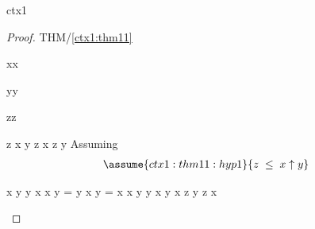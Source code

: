 \documentclass[12pt]{amsart}
\begin{document}
\begin{context}{ctx1}
\begin{proof}{THM/\ref{ctx1:thm11}}
\begin{free:var}{x}{x}
\begin{free:var}{y}{y}
\begin{free:var}{z}{z}
\begin{by:parts}
\begin{part:a}{ z \1\le x \uparrow y \2\implies z \le x \1\lor z \le y }
Assuming
	\begin{align}
	\assume{ctx1:thm11:hyp1}{ z \1\le x \uparrow y  } 
	\end{align}
	\begin{calculation}
		\true
		x \le y \1\lor y \le x
		x \uparrow y = y \1\lor x \uparrow y = x
		x \uparrow y \le y \1\lor x \uparrow y \le x
		z \le y \1\lor z \le x
	\end{calculation}
\end{part:a}
\end{by:parts}
	\end{free:var} 
	\end{free:var} 
	\end{free:var} 
\end{proof}

\end{context}
\end{document}
